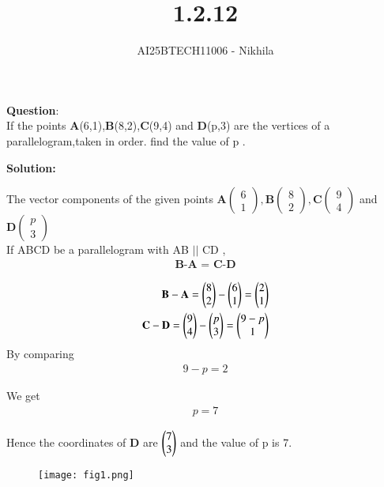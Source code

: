 \documentclass[journal]{IEEEtran}
\begin{document}

\vspace{3cm}

\title{1.2.12}
\author{AI25BTECH11006 - Nikhila}
{\let\newpage\relax\maketitle}


\renewcommand{\thefigure}{\theenumi}
\renewcommand{\thetable}{\theenumi}
\setlength{\intextsep}{10pt} %


\renewcommand{\thetable}{\theenumi}


\textbf{Question}:\\

If the points \textbf{A}(6,1),\textbf{B}(8,2),\textbf{C}(9,4) and \textbf{D}(p,3) are the vertices of a parallelogram,taken in order. find the value of p .\\

\vspace{2em}

\textbf{Solution: }

The vector components of the given points $\textbf{A}\begin{pmatrix}6 \\ 1 \end{pmatrix} , \textbf{B}\begin{pmatrix}8 \\ 2\end{pmatrix} , \textbf{C}\begin{pmatrix}9 \\ 4\end{pmatrix}$ and $\textbf{D}\begin{pmatrix}p \\ 3\end{pmatrix}$\\


 If ABCD be a parallelogram with AB $||$ CD ,
 \begin{align}
\textbf{B-A $=$ C-D}
\end{align}


\begin{align}
    \textbf{B}-\textbf{A}=\myvec{8 \\ 2} -\myvec{6 \\ 1}=\myvec{2 \\ 1}\\
    \textbf{C}-\textbf{D}=\myvec{9 \\ 4} -\myvec{p \\ 3}=\myvec{9-p \\ 1} 
\end{align}
By comparing 
\begin{align}
    9-p = 2
\end{align}

We get 
\begin{align}
    p = 7
\end{align}

Hence the coordinates of \textbf{D} are $\myvec{7 \\ 3}$ and the value of p is 7.

\begin{figure}[h!]
   \centering
   \texttt{[image: fig1.png]}
   \caption{}
   \label{stemplot}
\end{figure}
\end{document}

